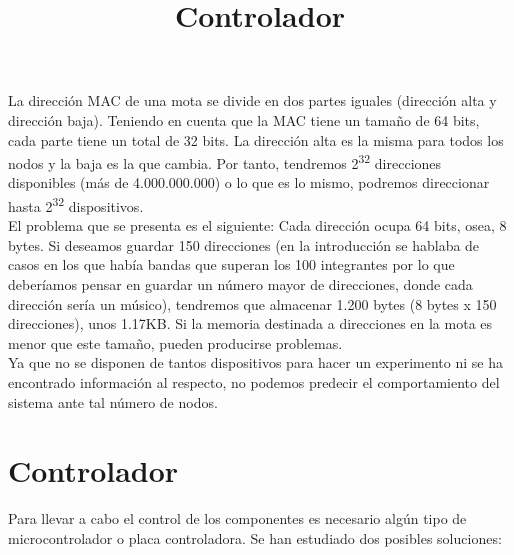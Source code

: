 La dirección MAC de una mota se divide en dos partes iguales (dirección alta y dirección baja).
Teniendo en cuenta que la MAC tiene un tamaño de 64 bits, cada parte tiene un total de 32 bits.
La dirección alta es la misma para todos los nodos y la baja es la que cambia. Por tanto, tendremos 2\textsuperscript{32} direcciones
disponibles (más de 4.000.000.000) o lo que es lo mismo, podremos direccionar hasta 2\textsuperscript{32} dispositivos.\\

El problema que se presenta es el siguiente: Cada dirección ocupa 64 bits, osea, 8 bytes. Si deseamos guardar 150
direcciones (en la introducción se hablaba de casos en los que había bandas que superan los 100 integrantes por lo que
deberíamos pensar en guardar un número mayor de direcciones, donde cada dirección sería un músico), tendremos que almacenar
1.200 bytes (8 bytes x 150 direcciones), unos 1.17KB. Si la memoria destinada a direcciones en la mota es menor que este tamaño,
pueden producirse problemas.\\

Ya que no se disponen de tantos dispositivos para hacer un experimento ni se ha encontrado información al respecto,
no podemos predecir el comportamiento del sistema ante tal número de nodos.\\

\section{Controlador}
\title{Controlador}

Para llevar a cabo el control de los componentes es necesario algún tipo de microcontrolador
o placa controladora. Se han estudiado dos posibles soluciones:

